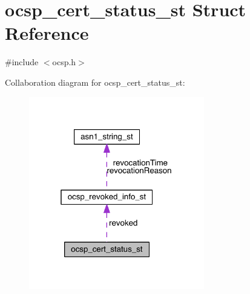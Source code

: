 \hypertarget{structocsp__cert__status__st}{}\section{ocsp\+\_\+cert\+\_\+status\+\_\+st Struct Reference}
\label{structocsp__cert__status__st}


{\ttfamily \#include $<$ocsp.\+h$>$}



Collaboration diagram for ocsp\+\_\+cert\+\_\+status\+\_\+st\+:\nopagebreak
\begin{figure}[H]
\begin{center}
\leavevmode
\includegraphics[width=217pt]{structocsp__cert__status__st__coll__graph}
\end{center}
\end{figure}
